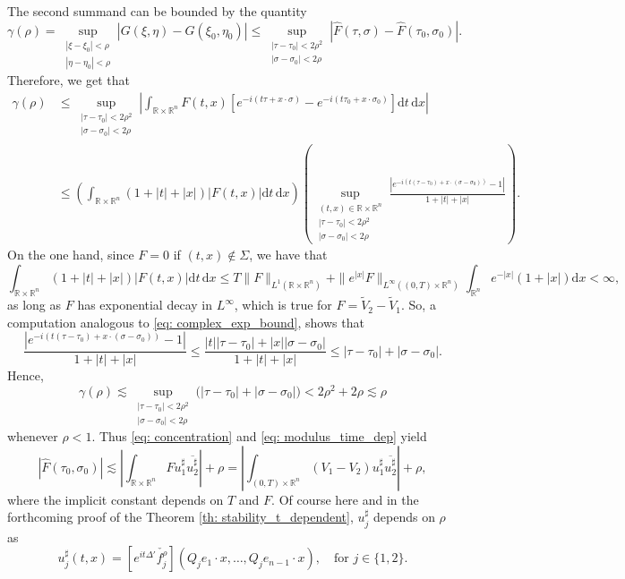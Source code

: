 \documentclass[10pt,a4paper]{amsart}
\theoremstyle{remark}
\theoremstyle{definition}
\newcommand{\R}{\mathbb{R}}
\newcommand{\dd}{\mathrm{d}}
\def\ovl{\overline}
\def\wt{\widetilde}
\begin{document}
The second summand can be bounded by the quantity
%
\[
\gamma(\rho)=\sup_{\substack{|\xi-\xi_0|<\rho\\|\eta-\eta_0|<\rho}}\left|G(\xi,\eta)-G(\xi_0,\eta_0)\right|\leq\sup_{\substack{|\tau-\tau_0|<2\rho^2\\|\sigma-\sigma_0|<2\rho}}\left|\widehat F(\tau,\sigma)-\widehat F(\tau_0,\sigma_0)\right|.
\]
%
Therefore, we get that
%
\begin{align*}
\gamma(\rho)&\leq\sup_{\substack{|\tau-\tau_0|<2\rho^2\\|\sigma-\sigma_0|<2\rho}}\left|\int_{\R\times\R^n}F(t,x)\left[e^{-i(t\tau+x\cdot\sigma)}-e^{-i(t\tau_0+x\cdot\sigma_0)}\right]\dd t\,\dd x\right|\\
%
&\leq \left(\int_{\R\times\R^n}(1+|t|+|x|)\left|F(t,x)\right|\dd t\,\dd x\right)
\left(\sup_{\substack{(t,x)\in \R\times \R^n\\|\tau - \tau_0|<2\rho^2\\|\sigma-\sigma_0|<2\rho}}\frac{\left|e^{-i(t(\tau-\tau_0)
+x\cdot (\sigma-\sigma_0))}-1\right|}{1+|t|+|x|}\right).
\end{align*}
%
On the one hand, since $F=0$ if $(t, x) \notin \Sigma$, we have that
%
\[
\int_{\R\times\R^n}(1+|t|+|x|)\left|F(t,x)\right|\dd t\,\dd x\leq T \|F\|_{L^1(\R \times \R^n)} + \|e^{|x|}F\|_{L^\infty((0, T)\times\R^n)}\int_{\R^n}e^{-|x|}(1+|x|)\dd x<\infty,
\]
%
as long as $F$ has exponential decay in $L^\infty$, which is true for $F=\wt{V}_2-\wt{V}_1$. So, a computation analogous to \eqref{eq: complex_exp_bound}, shows that
%
%
\[
\frac{\left|e^{-i(t(\tau-\tau_0)+x\cdot (\sigma-\sigma_0))}-1\right|}{1+|t|+|x|} 
\leq \frac{|t||\tau-\tau_0|+|x||\sigma-\sigma_0|}{1+|t|+|x|} 
\leq |\tau-\tau_0|+ |\sigma-\sigma_0|.
\]
%
%
Hence, 
%
\begin{equation}\label{eq: modulus_time_dep}
\gamma(\rho)\lesssim 
\sup_{\substack{|\tau-\tau_0|<2\rho^2\\|\sigma-\sigma_0|<2\rho}} \big(|\tau-\tau_0|+ |\sigma-\sigma_0| \big)<2\rho^2+2\rho 
\lesssim \rho
\end{equation}
%
whenever $\rho< 1$. Thus \eqref{eq: concentration} and \eqref{eq: modulus_time_dep} yield
%
\begin{equation}\label{eq: FT_time_dep}
	\left|\widehat F(\tau_0,\sigma_0)\right|\lesssim\left|\int_{ \R \times\R^n} Fu^\sharp_1\ovl{u^\sharp_2}\right| + \rho
	=\left| \int_{(0, T) \times \R^n} (V_1-V_2) u^\sharp_1 \ovl{u^\sharp_2}\right| + \rho,
\end{equation}
%
where the implicit constant depends on $T$ and $F$. Of course here and in the forthcoming proof of the Theorem \ref{th: stability_t_dependent}, $u^\sharp_j$ depends on $\rho$ as
%
\[
u_j^\sharp(t,x)=[e^{it\Delta'}\check {f_j^\rho}](Q_je_1\cdot x,\ldots, Q_je_{n-1}\cdot x) , \quad \text{for} \, \, j\in \{1, 2\}.
\]
\end{document}
